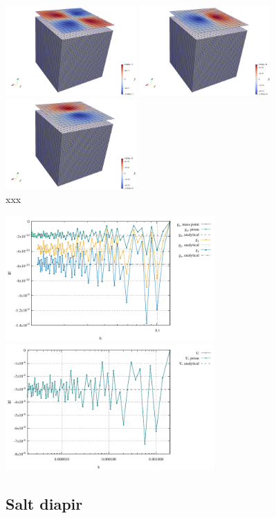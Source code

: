 \begin{center}
\includegraphics[width=5cm]{python_codes/fieldstone_84/cube/Txy}
\includegraphics[width=5cm]{python_codes/fieldstone_84/cube/Txz}
\includegraphics[width=5cm]{python_codes/fieldstone_84/cube/Tyz}\\
{\captionfont  xxx}
\end{center}


\begin{center}
\includegraphics[width=8cm]{python_codes/fieldstone_84/cube/single_point_g.pdf}
\includegraphics[width=8cm]{python_codes/fieldstone_84/cube/single_point_U.pdf}\\
\end{center}


\newpage
\subsection*{Salt diapir}


